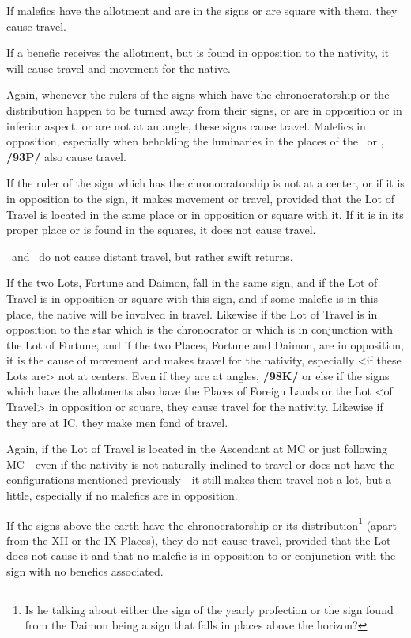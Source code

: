 If malefics have the allotment and are in the signs or are square with them, they cause travel. 

If a benefic receives the allotment, but is found in opposition to the nativity, it will cause travel and movement for the native. 

Again, whenever the rulers of the signs which have the chronocratorship or the distribution happen to be turned
away from their signs, or are in opposition or in inferior aspect, or are not at an angle, these signs cause
travel. Malefics in opposition, especially when beholding the luminaries in the places of the \Sun\, or \Moon,
\textbf{/93P/} also cause travel. 

If the ruler of the sign which has the chronocratorship is not at a center, or if it is in opposition to the sign, it makes movement or travel, provided that the Lot of Travel is located in the same place or in opposition or square with it. If it is in its proper place or is found in the squares, it does
not cause travel.

 
\Mercury\, and \Venus\, do not cause distant travel, but rather swift returns. 

If the two Lots, Fortune and Daimon, fall in the same sign, and if the Lot of Travel is in opposition or square with this sign, and if some malefic is in this place, the native will be involved in travel. Likewise if the Lot of Travel is in opposition to the star which is the chronocrator or which is in conjunction with the Lot of Fortune, and if the two Places, Fortune and Daimon, are in opposition, it is the cause of movement and makes travel for the nativity, especially <if these Lots are> not at centers. Even if they are at angles, \textbf{/98K/} or else if the signs which have the allotments also have the Places of Foreign Lands or the Lot <of Travel> in opposition or square, they cause travel for the nativity. Likewise if they are at IC, they make men fond of travel. 

Again, if the Lot of Travel is located in the Ascendant at MC or just following MC—even if the nativity is not naturally inclined to travel or does not have the configurations mentioned previously—it still makes them travel not a lot, but a little, especially if no malefics are in opposition.

If the signs above the earth have the chronocratorship or its distribution\footnote{Is he talking about either the sign of the yearly profection or the sign found from the Daimon being a sign that falls in places above the horizon?} (apart from the XII or the IX Places), they do not cause travel, provided that the Lot does not cause it and that no malefic is in opposition to or conjunction with the sign with no benefics associated. 


